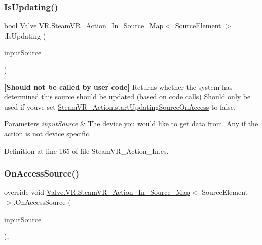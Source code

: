 \subsubsection{\texorpdfstring{IsUpdating()}{IsUpdating()}}
{\footnotesize\ttfamily bool \mbox{\hyperlink{class_valve_1_1_v_r_1_1_steam_v_r___action___in___source___map}{Valve.\+V\+R.\+Steam\+V\+R\+\_\+\+Action\+\_\+\+In\+\_\+\+Source\+\_\+\+Map}}$<$ Source\+Element $>$.Is\+Updating (\begin{DoxyParamCaption}\item[{\mbox{\hyperlink{namespace_valve_1_1_v_r_a82e5bf501cc3aa155444ee3f0662853f}{Steam\+V\+R\+\_\+\+Input\+\_\+\+Sources}}}]{input\+Source }\end{DoxyParamCaption})}



{\bfseries{\mbox{[}Should not be called by user code\mbox{]}}} Returns whether the system has determined this source should be updated (based on code calls) Should only be used if you\textquotesingle{}ve set \mbox{\hyperlink{class_valve_1_1_v_r_1_1_steam_v_r___action_ae27e9858dec18a4307cca7779ed87ad8}{Steam\+V\+R\+\_\+\+Action.\+start\+Updating\+Source\+On\+Access}} to false. 


\begin{DoxyParams}{Parameters}
{\em input\+Source} & The device you would like to get data from. Any if the action is not device specific.\\
\hline
\end{DoxyParams}


Definition at line 165 of file Steam\+V\+R\+\_\+\+Action\+\_\+\+In.\+cs.

\mbox{\label{class_valve_1_1_v_r_1_1_steam_v_r___action___in___source___map_aacbc05f0647705e1268c2bda304481a9}} 
\subsubsection{\texorpdfstring{OnAccessSource()}{OnAccessSource()}}
{\footnotesize\ttfamily override void \mbox{\hyperlink{class_valve_1_1_v_r_1_1_steam_v_r___action___in___source___map}{Valve.\+V\+R.\+Steam\+V\+R\+\_\+\+Action\+\_\+\+In\+\_\+\+Source\+\_\+\+Map}}$<$ Source\+Element $>$.On\+Access\+Source (\begin{DoxyParamCaption}\item[{\mbox{\hyperlink{namespace_valve_1_1_v_r_a82e5bf501cc3aa155444ee3f0662853f}{Steam\+V\+R\+\_\+\+Input\+\_\+\+Sources}}}]{input\+Source }\end{DoxyParamCaption})\hspace{0.3cm}{\ttfamily [protected]}, {\ttfamily [virtual]}}



